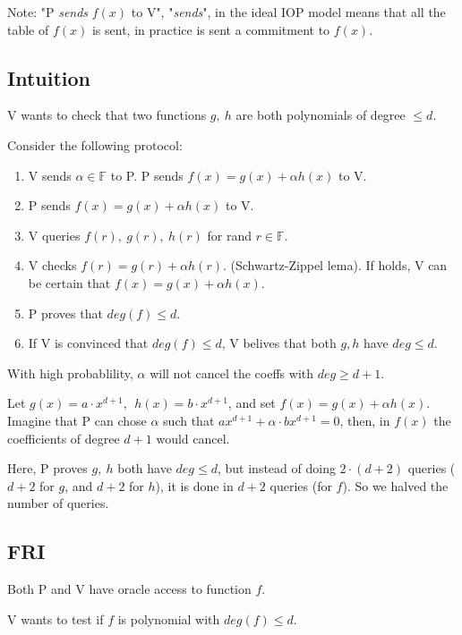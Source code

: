 \documentclass{article}
\theoremstyle{definition}
\begin{document}
Note: "P \emph{sends} $f(x)$ to V", "\emph{sends}", in the ideal IOP model means that all the table of $f(x)$ is sent, in practice is sent a commitment to $f(x)$.

\subsection{Intuition}
V wants to check that two functions $g,~h$ are both polynomials of degree $\leq d$.

Consider the following protocol:

\begin{enumerate}
	\item V sends $\alpha \in \mathbb{F}$ to P. P sends $f(x) = g(x) + \alpha h(x)$ to V.
	\item P sends $f(x)=g(x) + \alpha h(x)$ to V.
	\item V queries $f(r), ~g(r), ~h(r)$ for rand $r \in \mathbb{F}$.
	\item V checks $f(r)=g(r) + \alpha h(r)$. (Schwartz-Zippel lema).
		If holds, V can be certain that $f(x)=g(x)+ \alpha h(x)$.
	\item P proves that $deg(f) \leq d$. 
	\item If V is convinced that $deg(f) \leq d$, V belives that both $g, h$ have $deg \leq d$.
\end{enumerate}

With high probablility, $\alpha$ will not cancel the coeffs with $deg \geq d+1$. %

Let $g(x)=a \cdot x^{d+1}, ~~ h(x)=b \cdot x^{d+1}$, and set $f(x) = g(x) + \alpha h(x)$.
Imagine that P can chose $\alpha$ such that $a x^{d+1} + \alpha \cdot b x^{d+1} = 0$, then, in $f(x)$ the coefficients of degree $d+1$ would cancel.

\quad

Here, P proves $g,~h$ both have $deg \leq d$, but instead of doing $2 \cdot (d+2)$ queries ($d+2$ for $g$, and $d+2$ for $h$), it is done in $d+2$ queries (for $f$).
So we halved the number of queries.


\subsection{FRI}
Both P and V have oracle access to function $f$.

V wants to test if $f$ is polynomial with $deg(f) \leq d$.
\end{document}
